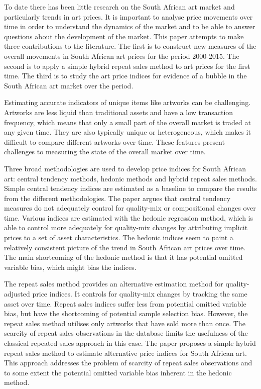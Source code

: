 \documentclass[12pt,]{article}
\begin{document}
To date there has been little research on the South African art market
and particularly trends in art prices. It is important to analyse price
movements over time in order to understand the dynamics of the market
and to be able to answer questions about the development of the market.
This paper attempts to make three contributions to the literature. The
first is to construct new measures of the overall movements in South
African art prices for the period 2000-2015. The second is to apply a
simple hybrid repeat sales method to art prices for the first time. The
third is to study the art price indices for evidence of a bubble in the
South African art market over the period.

Estimating accurate indicators of unique items like artworks can be
challenging. Artworks are less liquid than traditional assets and have a
low transaction frequency, which means that only a small part of the
overall market is traded at any given time. They are also typically
unique or heterogeneous, which makes it difficult to compare different
artworks over time. These features present challenges to measuring the
state of the overall market over time.

Three broad methodologies are used to develop price indices for South
African art: central tendency methods, hedonic methods and hybrid repeat
sales methods. Simple central tendency indices are estimated as a
baseline to compare the results from the different methodologies. The
paper argues that central tendency measures do not adequately control
for quality-mix or compositional changes over time. Various indices are
estimated with the hedonic regression method, which is able to control
more adequately for quality-mix changes by attributing implicit prices
to a set of asset characteristics. The hedonic indices seem to paint a
relatively consistent picture of the trend in South African art prices
over time. The main shortcoming of the hedonic method is that it has
potential omitted variable bias, which might bias the indices.

The repeat sales method provides an alternative estimation method for
quality-adjusted price indices. It controls for quality-mix changes by
tracking the same asset over time. Repeat sales indices suffer less from
potential omitted variable bias, but have the shortcoming of potential
sample selection bias. However, the repeat sales method utilises only
artworks that have sold more than once. The scarcity of repeat sales
observations in the database limits the usefulness of the classical
repeated sales approach in this case. The paper proposes a simple hybrid
repeat sales method to estimate alternative price indices for South
African art. This approach addresses the problem of scarcity of repeat
sales observations and to some extent the potential omitted variable
bias inherent in the hedonic method.
\end{document}
